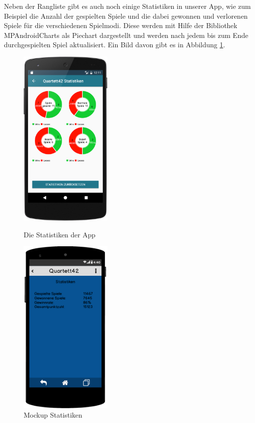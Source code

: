 Neben der Rangliste gibt es auch noch einige Statistiken in unserer App, wie zum Beispiel die Anzahl der gespielten Spiele und die dabei gewonnen und verlorenen Spiele für die verschiedenen Spielmodi. Diese werden mit Hilfe der Bibliothek MPAndroidCharts als Piechart dargestellt und werden nach jedem bis zum Ende durchgespielten Spiel aktualisiert. Ein Bild davon gibt es in Abbildung \ref{figure:implementierungstatistiken}.\\

\begin{figure}[h]
    \centering
    \begin{minipage}{0.49\textwidth}
        \centering
        \includegraphics[width=0.4\textwidth]{img/screenshots/device_statistics.png}
		\caption{Die Statistiken der App}
		\label{figure:implementierungstatistiken}
	\end{minipage}
    \begin{minipage}{0.49\textwidth}
        \centering
        \includegraphics[width=0.4\textwidth]{img/mockups/statistiken.png}
        \caption{Mockup Statistiken}
    \end{minipage}
\end{figure}



